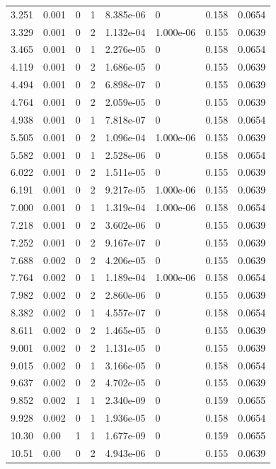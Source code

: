 \documentclass[preview]{standalone}
\begin{document}
{{\begin{tabular}{L{1.2cm}C{1.2cm} C{0.3cm}C{0.5cm} C{1.4cm}C{1.4cm} C{1.4cm}C{1.4cm}}
  3.251  &  0.001  & 0     &  1 &  8.385e-06  & 0  & 0.158 &  0.0654   \\ 
  3.329  &  0.001  & 0     &  2 &  1.132e-04  & 1.000e-06  & 0.155 &  0.0639   \\ 
  3.465  &  0.001  & 0     &  1 &  2.276e-05  & 0  & 0.158 &  0.0654   \\ 
  4.119  &  0.001  & 0     &  2 &  1.686e-05  & 0  & 0.155 &  0.0639   \\ 
  4.494  &  0.001  & 0     &  2 &  6.898e-07  & 0  & 0.155 &  0.0639   \\ 
  4.764  &  0.001  & 0     &  2 &  2.059e-05  & 0  & 0.155 &  0.0639   \\ 
  4.938  &  0.001  & 0     &  1 &  7.818e-07  & 0  & 0.158 &  0.0654   \\ 
  5.505  &  0.001  & 0     &  2 &  1.096e-04  & 1.000e-06  & 0.155 &  0.0639   \\ 
  5.582  &  0.001  & 0     &  1 &  2.528e-06  & 0  & 0.158 &  0.0654   \\ 
  6.022  &  0.001  & 0     &  2 &  1.511e-05  & 0  & 0.155 &  0.0639   \\ 
  6.191  &  0.001  & 0     &  2 &  9.217e-05  & 1.000e-06  & 0.155 &  0.0639   \\ 
  7.000  &  0.001  & 0     &  1 &  1.319e-04  & 1.000e-06  & 0.158 &  0.0654   \\ 
  7.218  &  0.001  & 0     &  2 &  3.602e-06  & 0  & 0.155 &  0.0639   \\ 
  7.252  &  0.001  & 0     &  2 &  9.167e-07  & 0  & 0.155 &  0.0639   \\ 
  7.688  &  0.002  & 0     &  2 &  4.206e-05  & 0  & 0.155 &  0.0639   \\ 
  7.764  &  0.002  & 0     &  1 &  1.189e-04  & 1.000e-06  & 0.158 &  0.0654   \\ 
  7.982  &  0.002  & 0     &  2 &  2.860e-06  & 0  & 0.155 &  0.0639   \\ 
  8.382  &  0.002  & 0     &  1 &  4.557e-07  & 0  & 0.158 &  0.0654   \\ 
  8.611  &  0.002  & 0     &  2 &  1.465e-05  & 0  & 0.155 &  0.0639   \\ 
  9.001  &  0.002  & 0     &  2 &  1.131e-05  & 0  & 0.155 &  0.0639   \\ 
  9.015  &  0.002  & 0     &  1 &  3.166e-05  & 0  & 0.158 &  0.0654   \\ 
  9.637  &  0.002  & 0     &  2 &  4.702e-05  & 0  & 0.155 &  0.0639   \\ 
  9.852  &  0.002  & 1     &  1 &  2.340e-09  & 0  & 0.159 &  0.0655   \\ 
  9.928  &  0.002  & 0     &  1 &  1.936e-05  & 0  & 0.158 &  0.0654   \\ 
  10.30  &  0.00  & 1     &  1 &  1.677e-09  & 0  & 0.159 &  0.0655   \\ 
  10.51  &  0.00  & 0     &  2 &  4.943e-06  & 0  & 0.155 &  0.0639   \\ 
\hline 
\end{tabular} 

}}
\end{document}
